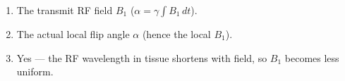 \begin{enumerate}[leftmargin=1.6em,itemsep=2pt]
\item The transmit RF field $B_1$ ($\alpha = \gamma\int B_1\,dt$).
\item The actual local flip angle $\alpha$ (hence the local $B_1$).
\item Yes --- the RF wavelength in tissue shortens with field, so $B_1$ becomes less uniform.
\end{enumerate}
